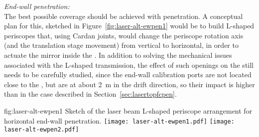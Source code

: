 

{\it End-wall  penetration:}\\ 
The best possible  coverage should be achieved with  penetration. A conceptual plan for this, sketched in Figure~\ref{fig:laser-alt-ewpen1} would be to build L-shaped periscopes that, using Cardan joints, would change the periscope rotation axis (and the translation stage movement) from vertical to horizontal, in order to actuate the mirror inside the . In addition to solving the mechanical issues associated with the L-shaped transmission, the effect of such openings on the \efield still needs to be carefully studied, since the end-wall calibration ports are not located close to the , but are at about \SI{2}{\m} in the drift direction, so their impact is higher than in the case described in Section~\ref{sec:lasertopfcpen}.

\begin{dunefigure}{fig:laser-alt-ewpen1}
{Sketch of the laser beam L-shaped periscope arrangement for horizontal end-wall  penetration.}
\texttt{[image: laser-alt-ewpen1.pdf]}
\texttt{[image: laser-alt-ewpen2.pdf]}
\end{dunefigure}

